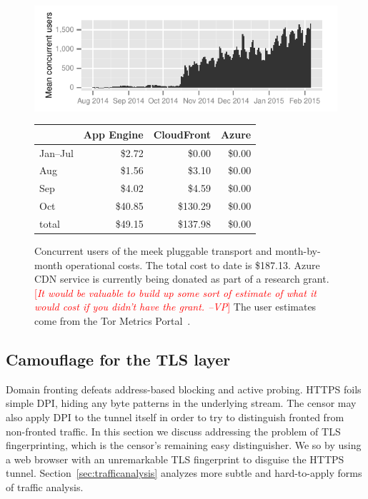 \documentclass{sig-alternate}
\newcommand{\meek}{meek\xspace}
\newcommand{\note}[1]{{\textcolor{red}{[\textit{#1}]}}}
\newcommand{\vp}[1]{\note{#1 --VP}}
\begin{document}
\begin{figure}
\centering
\includegraphics[width=\linewidth]{clients-meek}
\begin{tabular}{l r r r}
       &App Engine &CloudFront&  Azure \\
\hline
Jan--Jul &  \$2.72 &   \$0.00 & \$0.00 \\
Aug      &  \$1.56 &   \$3.10 & \$0.00 \\
Sep      &  \$4.02 &   \$4.59 & \$0.00 \\
Oct      & \$40.85 & \$130.29 & \$0.00 \\
\hline
total    & \$49.15 & \$137.98 & \$0.00 \\
\end{tabular}
\caption{
Concurrent users of the \meek pluggable transport
and month-by-month operational costs.
The total cost to date is \$187.13.
Azure CDN service is currently being donated as part of a research grant.
\vp{It would be valuable to build up some sort of estimate of what it
would cost if you didn't have the grant.}
The user estimates come from the Tor Metrics Portal~\cite{metrics-meek,counting-daily-bridge-users}.
}
\label{fig:clients-tor}
\end{figure}

\subsection{Camouflage for the TLS layer}
\label{sec:browserextension}

Domain fronting defeats address-based blocking and active probing.
HTTPS foils simple DPI,
hiding any byte patterns in the underlying stream.
The censor may also apply DPI to the tunnel itself in order to try to
distinguish fronted from non-fronted traffic.
In this section we discuss addressing the problem of TLS fingerprinting,
which is the censor's remaining easy distinguisher.
We so by using a web browser with an unremarkable TLS fingerprint
to disguise the HTTPS tunnel.
Section~\ref{sec:trafficanalysis} analyzes
more subtle and hard-to-apply forms of traffic analysis.
\end{document}
